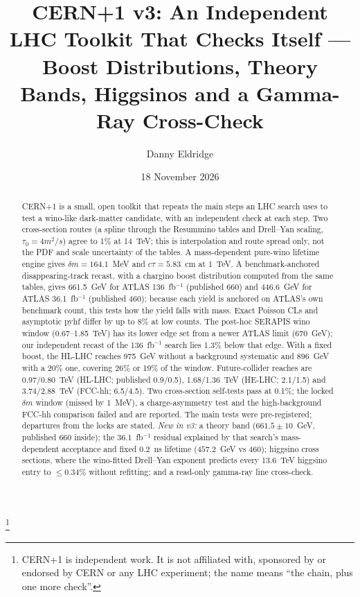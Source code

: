 \documentclass[aps,prd,twocolumn,superscriptaddress,nofootinbib,showkeys]{revtex4-2}
\begin{document}
\title{CERN+1 v3: An Independent LHC Toolkit That Checks Itself --- Boost Distributions, Theory Bands, Higgsinos and a Gamma-Ray Cross-Check}
\author{Danny Eldridge}
\thanks{CERN+1 is independent work. It is not affiliated with, sponsored by or endorsed by CERN or any LHC experiment; the name means ``the chain, plus one more check''.}
\date{18 November 2026}
\begin{abstract}
CERN+1 is a small, open toolkit that repeats the main steps an LHC search uses to test a wino-like dark-matter candidate, with an independent check at each step. Two cross-section routes (a spline through the Resummino tables and Drell--Yan scaling, $\tau_0=4m^2/s$) agree to 1\% at 14~TeV; this is interpolation and route spread only, not the PDF and scale uncertainty of the tables. A mass-dependent pure-wino lifetime engine gives $\delta m=164.1$~MeV and $c\tau=5.83$~cm at 1~TeV. A benchmark-anchored disappearing-track recast, with a chargino boost distribution computed from the same tables, gives 661.5~GeV for ATLAS 136~fb$^{-1}$ (published 660) and 446.6~GeV for ATLAS 36.1~fb$^{-1}$ (published 460); because each yield is anchored on ATLAS's own benchmark count, this tests how the yield falls with mass. Exact Poisson CLs and asymptotic pyhf differ by up to 8\% at low counts. The post-hoc SERAPIS wino window (0.67--1.85~TeV) has its lower edge set from a newer ATLAS limit (670~GeV); our independent recast of the 136~fb$^{-1}$ search lies 1.3\% below that edge. With a fixed boost, the HL-LHC reaches 975~GeV without a background systematic and 896~GeV with a 20\% one, covering 26\% or 19\% of the window. Future-collider reaches are 0.97/0.80~TeV (HL-LHC; published 0.9/0.5), 1.68/1.36~TeV (HE-LHC; 2.1/1.5) and 3.74/2.88~TeV (FCC-hh; 6.5/4.5). Two cross-section self-tests pass at 0.1\%; the locked $\delta m$ window (missed by 1~MeV), a charge-asymmetry test and the high-background FCC-hh comparison failed and are reported. The main tests were pre-registered; departures from the locks are stated. \emph{New in v3:} a theory band ($661.5\pm10$~GeV, published 660 inside); the 36.1~fb$^{-1}$ residual explained by that search's mass-dependent acceptance and fixed 0.2~ns lifetime ($457.2$~GeV vs 460); higgsino cross sections, where the wino-fitted Drell--Yan exponent predicts every 13.6~TeV higgsino entry to $\le0.34\%$ without refitting; and a read-only gamma-ray line cross-check.
\end{abstract}
\maketitle
\end{document}
